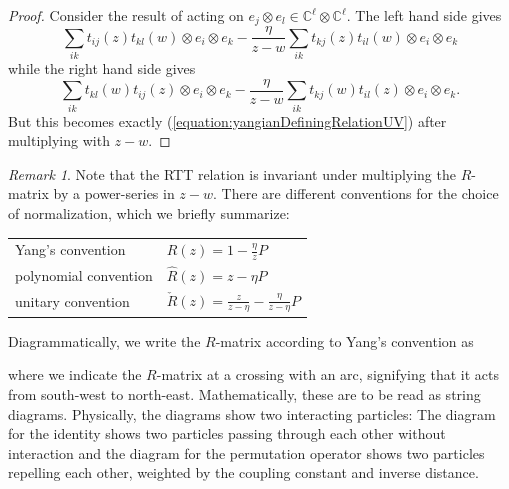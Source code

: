 \documentclass[11pt]{report}
\theoremstyle{definition}
\theoremstyle{remark}
\newtheorem*{remark}{Remark}
\theoremstyle{remark}
\newcommand{\C}{\mathbb{C}}
\begin{document}
\begin{proof}
Consider the result of acting on $e_j \otimes e_l \in \C^\ell \otimes \C^\ell$. The left hand side gives
\begin{equation*}
\sum_{ik} t_{ij}(z) t_{kl}(w) \otimes e_i \otimes e_k - \frac{\eta}{z-w} \sum_{ik} t_{kj}(z) t_{il}(w) \otimes e_i \otimes e_k
\end{equation*}
while the right hand side gives
\begin{equation*}
\sum_{ik} t_{kl}(w) t_{ij}(z) \otimes e_i \otimes e_k - \frac{\eta}{z-w} \sum_{ik} t_{kj}(w) t_{il}(z) \otimes e_i \otimes e_k.
\end{equation*}
But this becomes exactly (\ref{equation:yangianDefiningRelationUV}) after multiplying with $z-w$.
\end{proof}

\begin{remark}
Note that the RTT relation is invariant under multiplying the $R$-matrix by a power-series in $z-w$. There are different conventions for the choice of normalization, which we briefly summarize:
\begin{center}
\begin{tabular}{|l||l|}
\hline
Yang's convention & $R(z) = 1 - \frac{\eta}{z} P$ \\
polynomial convention & $\hat R(z) = z - \eta P$ \\
unitary convention & $\check R(z) = \frac{z}{z-\eta} - \frac{\eta}{z-\eta} P$ \\
\hline
\end{tabular}
\end{center}
Diagrammatically, we write the $R$-matrix according to Yang's convention as
~\\
\begin{center}
\end{center}
where we indicate the $R$-matrix at a crossing with an arc, signifying that it acts from south-west to north-east. Mathematically, these are to be read as string diagrams. Physically, the diagrams show two interacting particles: The diagram for the identity shows two particles passing through each other without interaction and the diagram for the permutation operator shows two particles repelling each other, weighted by the coupling constant and inverse distance.


\end{remark}
\end{document}
